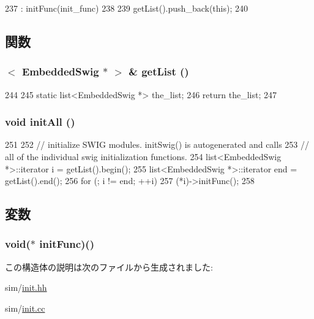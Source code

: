 \begin{DoxyCode}
237     : initFunc(init_func)
238 {
239     getList().push_back(this);
240 }
\end{DoxyCode}


\subsection{関数}
\hypertarget{structEmbeddedSwig_ad2bcd7f5b4c3189310c7a8c36ab76e0f}{
\subsubsection[{getList}]{$<$ {\bf EmbeddedSwig} $\ast$ $>$ \& getList ()}}
\label{structEmbeddedSwig_ad2bcd7f5b4c3189310c7a8c36ab76e0f}



\begin{DoxyCode}
244 {
245     static list<EmbeddedSwig *> the_list;
246     return the_list;
247 }
\end{DoxyCode}
\hypertarget{structEmbeddedSwig_af92e16b8081e002c83c30ea3059bd9dc}{
\subsubsection[{initAll}]{\setlength{\rightskip}{0pt plus 5cm}void initAll ()}}
\label{structEmbeddedSwig_af92e16b8081e002c83c30ea3059bd9dc}



\begin{DoxyCode}
251 {
252     // initialize SWIG modules.  initSwig() is autogenerated and calls
253     // all of the individual swig initialization functions.
254     list<EmbeddedSwig *>::iterator i = getList().begin();
255     list<EmbeddedSwig *>::iterator end = getList().end();
256     for (; i != end; ++i)
257         (*i)->initFunc();
258 }
\end{DoxyCode}


\subsection{変数}
\hypertarget{structEmbeddedSwig_ad81d22e66fbb8a97010b1beea9745bd8}{
\subsubsection[{initFunc}]{\setlength{\rightskip}{0pt plus 5cm}void($\ast$ {\bf initFunc})()}}
\label{structEmbeddedSwig_ad81d22e66fbb8a97010b1beea9745bd8}


この構造体の説明は次のファイルから生成されました:\begin{DoxyCompactItemize}
\item 
sim/\hyperlink{init_8hh}{init.hh}\item 
sim/\hyperlink{init_8cc}{init.cc}\end{DoxyCompactItemize}
